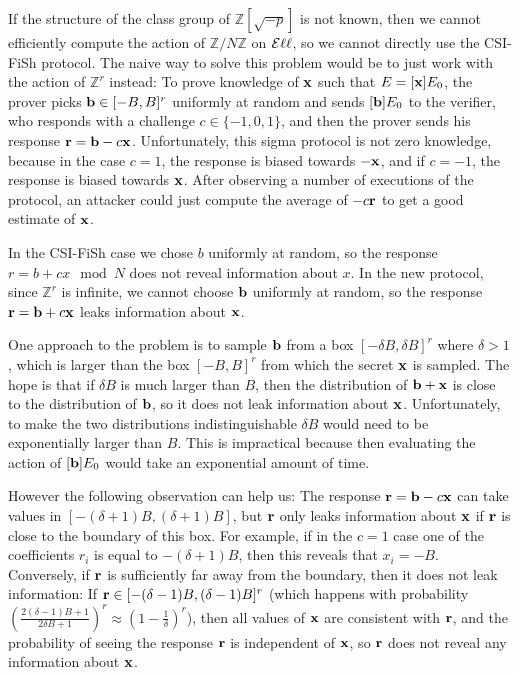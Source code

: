 If the structure of the class group of $\mathbb{Z}[\sqrt{-p}]$ is not known, then we cannot efficiently compute the action of $\mathbb{Z}/N \mathbb{Z}$ on $\mathcal{E}\ell\ell$, so we cannot directly use the CSI-FiSh protocol. The naive way to solve this problem would be to just work with the action of $\mathbb{Z}^r$ instead: To prove knowledge of $\mathbf{x}$ such that $E = [\mathbf{x}]E_0$, the prover picks $\mathbf{b} \in [-B,B]^r$ uniformly at random and sends $[\mathbf{b}]E_0$ to the verifier, who responds with a challenge $c \in \{-1,0,1\}$, and then the prover sends his response $\mathbf{r} = \mathbf{b} - c\mathbf{x}$. Unfortunately, this sigma protocol is not zero knowledge, because in the case $c = 1$, the response is biased towards $-\mathbf{x}$, and if $c = -1$, the response is biased towards $\mathbf{x}$. After observing a number of executions of the protocol, an attacker could just compute the average of $- c \mathbf{r}$ to get a good estimate of $\mathbf{x}$.

In the CSI-FiSh case we chose $b$ uniformly at random, so the response $r = b + cx \mod N$ does not reveal information about $x$. In the new protocol, since $\mathbb{Z}^r$ is infinite, we cannot choose $\mathbf{b}$ uniformly at random, so the response $\mathbf{r} = \mathbf{b} + c \mathbf{x}$ leaks information about $\mathbf{x}$.



One approach to  the problem is to sample $\mathbf{b}$ from a box $[-\delta B,\delta B]^r$ where $\delta > 1$, which is larger than the box $[-B,B]^r$ from which the secret $\mathbf{x}$ is sampled. The hope is that if $\delta B$ is much larger than $B$, then the distribution of $\mathbf{b} + \mathbf{x}$ is close to the distribution of $\mathbf{b}$, so it does not leak information about $\mathbf{x}$. Unfortunately, to make the two distributions indistinguishable $\delta B$ would need to be exponentially larger than $B$. This is impractical because then evaluating the action of $[\mathbf{b}]E_0$ would take an exponential amount of time.

However the following observation can help us: The response $\mathbf{r} = \mathbf{b} - c \mathbf{x}$ can take values in $[-(\delta + 1)B,(\delta + 1)B]$, but $\mathbf{r}$ only leaks information about $\mathbf{x}$ if $\mathbf{r}$ is close to the boundary of this box. For example, if in the $c = 1$ case one of the coefficients $r_i$ is equal to $-(\delta+1)B$, then this reveals that $x_i = -B$. Conversely, if $\mathbf{r}$ is sufficiently far away from the boundary, then it does not leak information: If $\mathbf{r} \in [-(\delta-1) B, (\delta-1) B]^r$ (which happens with probability $\left( \frac{2(\delta-1) B+1}{2\delta B+1} \right)^r \approx \left(1 - \frac{1}{\delta}\right)^r$), then all values of $\mathbf{x}$ are consistent with $\mathbf{r}$, and the probability of seeing the response $\mathbf{r}$ is independent of $\mathbf{x}$, so $\mathbf{r}$ does not reveal any information about $\mathbf{x}$. 

